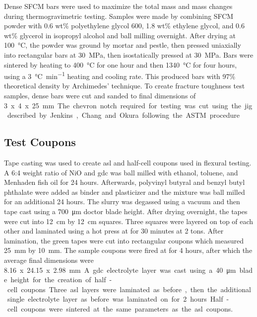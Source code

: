         Dense SFCM bars were used to maximize the total mass and mass changes during thermogravimetric testing.
        Samples were made by combining SFCM powder with 0.6 wt\% polyethylene glycol 600, 1.8 wt\% ethylene glycol, and 0.6 wt\% glycerol in isopropyl alcohol and ball milling overnight.
        After drying at \SI{100}{\celsius}, the powder was ground by mortar and pestle, then pressed uniaxially into rectangular bars at \SI{30}{\mega\pascal}, then isostatically pressed at \SI{30}{\mega\pascal}.
        Bars were sintered by heating to \SI{400}{\celsius} for one hour and then \SI{1340}{\celsius} for four hours, using a \SI{3}{\celsius\per\minute} heating and cooling rate.
        This produced bars with 97\% theoretical density by Archimedes' technique.
        To create fracture toughness test samples, dense bars were cut and sanded to final dimensions of \SI{3} x \SI{4} x \SI{25}{mm}.
        The chevron notch required for testing was cut using the jig described by Jenkins, Chang and Okura following the ASTM procedure.\cite{Jenkins1988, ASTM2016a}

    \subsection{Test Coupons}
        Tape casting was used to create \gls{asl} and half-cell coupons used in flexural testing.
        A 6:4 weight ratio of NiO and \gls{gdc} was ball milled with ethanol, toluene, and Menhaden fish oil for 24 hours.
        Afterwards, polyvinyl butyral and benzyl butyl phthalate were added as binder and plasticizer and the mixture was ball milled for an additional 24 hours.
        The slurry was degassed using a vacuum and then tape cast using a \SI{700}{\micro\meter} doctor blade height.
        After drying overnight, the tapes were cut into \SI{12}{\centi\meter} by \SI{12}{\centi\meter} squares.
        Three squares were layered on top of each other and laminated using a hot press at  for 30 minutes at 2 tons.
        After lamination, the green tapes were cut into rectangular coupons which measured \SI{25}{\milli\meter} by \SI{10}{\milli\meter}.
        The sample coupons were fired at  for 4 hours, after which the average final dimensions were \SI{8.16} x \SI{24.15} x \SI{2.98}{\milli\meter}.

        A \gls{gdc} electrolyte layer was cast using a \SI{40}{\micro\meter} blade height for the creation of half-cell coupons.
        Three \gls{asl} layers were laminated as before, then the additional single electrolyte layer as before was laminated on for 2 hours.
        Half-cell coupons were sintered at the same parameters as the \gls{asl} coupons.

